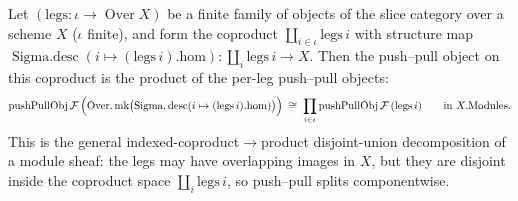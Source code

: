 \begin{lemma}
  \label{lem:pushPull_coprod_prod}
  Let \((\mathrm{legs} : \iota \to \operatorname{Over} X)\) be a finite family of objects of
  the slice category over a scheme \(X\) (\(\iota\) finite), and form the coproduct
  \(\coprod_{i \in \iota} \mathrm{legs}\,i\) with structure map
  \(\operatorname{Sigma.desc}(i \mapsto (\mathrm{legs}\,i).\mathrm{hom}) : \coprod_i
  \mathrm{legs}\,i \to X\). Then the push--pull object on this coproduct is the product of
  the per-leg push--pull objects:
  \[
    \operatorname{pushPullObj}\mathcal{F}\,\Bigl(\operatorname{Over.mk}\bigl(
      \operatorname{Sigma.desc}(i \mapsto (\mathrm{legs}\,i).\mathrm{hom})\bigr)\Bigr)
      \;\cong\;
    \prod_{i \in \iota} \operatorname{pushPullObj}\mathcal{F}\,(\mathrm{legs}\,i)
    \qquad \text{in } X.\mathrm{Modules}.
  \]
  This is the general indexed-coproduct\(\to\)product disjoint-union decomposition of a
  module sheaf: the legs may have overlapping images in \(X\), but they are disjoint inside
  the coproduct space \(\coprod_i \mathrm{legs}\,i\), so push--pull splits componentwise.
\end{lemma}
